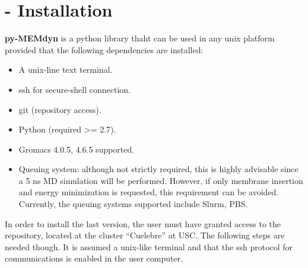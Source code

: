 \documentclass[10pt, oneside, pdftex]{article}
\begin{document}
\section*{ - Installation}
\textbf{py-MEMdyn} is a python library thaht can be used in  any unix
platform provided that the following dependencies are installed:
\begin{itemize}\itemsep0em
\item {A unix-line text terminal.}
\item {ssh for secure-shell connection.}
\item {git (repository access).}
\item {Python (required >= 2.7).}
\item {Gromacs 4.0.5, 4.6.5 supported.}
\item {Queuing  system:  although  not  strictly  required,  this  is  highly
advisable since  a 5 ns MD  simulation will be  performed. However, if
only  membrane insertion  and energy  minimization is  requested, this
requirement can  be avoided. Currently, the  queuing systems supported
include Slurm, PBS.}
\end{itemize}

In  order to  install the  last version,  the user  must  have granted
access  to  the  repository,  located  at the  cluster  ``Cuelebre''  at
USC. The following steps are  needed though. It is assumed a unix-like
terminal and  that the ssh  protocol for communications is  enabled in
the  user  computer.  
\end{document}
